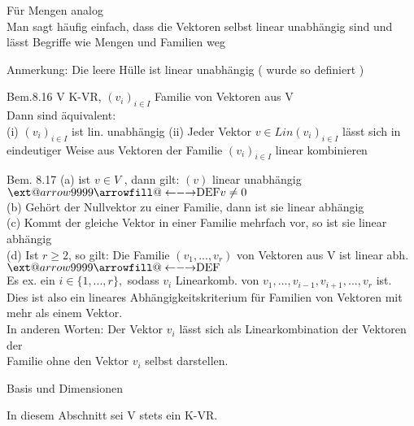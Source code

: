 \documentclass[smallheadings,12pt,a4paper]{scrartcl}
\makeatletter
\newcommand\xleftrightarrow[2][]{%
  \ext@arrow 9999{\longleftrightarrowfill@}{#1}{#2}}
\newcommand\longleftrightarrowfill@{%
  \arrowfill@\leftarrow\relbar\rightarrow}
\makeatother
\begin{document}
Für Mengen analog \\

Man sagt häufig einfach, dass die Vektoren selbst linear unabhängig sind und lässt Begriffe wie Mengen und Familien weg \\

\item Anmerkung: Die leere Hülle ist linear unabhängig ( wurde so definiert ) \\

\newpage

\item[Bem.8.16] 
V K-VR, $(v_i)_{i \in I}$ Familie von Vektoren aus V \\
Dann sind äquivalent: \\

(i) $(v_i)_{i \in I}$ ist lin. unabhängig 
(ii) Jeder Vektor $ v \in \textit{Lin}(v_i)_{i \in I}$ lässt sich in eindeutiger Weise aus Vektoren der Familie $(v_i)_{i \in I}$ linear kombinieren

\item[Bem. 8.17]
(a) ist $v \in V$ , dann gilt: $(v)$ linear unabhängig $\xleftrightarrow{\text{DEF}} v \neq 0 $ \\
(b) Gehört der Nullvektor zu einer Familie, dann ist sie linear abhängig \\
(c) Kommt der gleiche Vektor in einer Familie mehrfach vor, so ist sie linear abhängig \\
(d) Ist $r \geq 2$, so gilt: Die Familie $(v_1,...,v_r)$ von Vektoren aus V ist linear abh. $\xleftrightarrow{\text{DEF}}$ \\
Es ex. ein $i\in \{1,...,r\}, $ sodass $v_i$ Linearkomb. von $v_1,..., v_{i-1} , v_{i+1},...,v_r $ ist. \\
Dies ist also ein lineares Abhängigkeitskriterium für Familien von Vektoren mit mehr als einem Vektor. \\

In anderen Worten: Der Vektor $v_i$ lässt sich als Linearkombination der Vektoren der\\ Familie ohne den Vektor $v_i$ selbst darstellen. \\

\newpage

\begin{center}
\item[Basis und Dimensionen]
\end{center}
In diesem Abschnitt sei V stets ein K-VR.  \\
\end{document}
